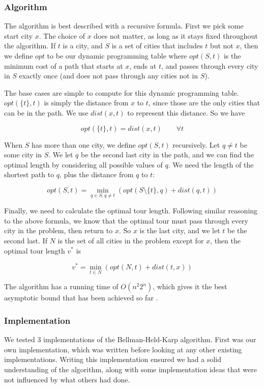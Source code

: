 \documentclass[11pt]{article}
\begin{document}
\subsubsection{Algorithm}

The algorithm is best described with a recursive formula. First we pick some start city $x$. The choice of $x$ does not matter, as long as it stays fixed throughout the algorithm. If $t$ is a city, and $S$ is a set of cities that includes $t$ but not $x$, then we define $opt$ to be our dynamic programming table where $opt(S,t)$ is the minimum cost of a path that starts at $x$, ends at $t$, and passes through every city in $S$ exactly once (and does not pass through any cities not in $S$).

The base cases are simple to compute for this dynamic programming table. $opt(\{ t \} , t)$ is simply the distance from $x$ to $t$, since those are the only cities that can be in the path. We use $dist(x,t)$ to represent this distance. So we have

\[ opt(\{ t \}, t) = dist(x,t) \qquad \forall t \]

When $S$ has more than one city, we define $opt(S,t)$ recursively. Let $q \neq t$ be some city in $S$. We let $q$ be the second last city in the path, and we can find the optimal length by considering all possible values of $q$. We need the length of the shortest path to $q$, plus the distance from $q$ to $t$:

\[ opt(S,t) = \min_{q \in S, q \neq t} ( opt(S \setminus \{ t \} , q) + dist(q, t) ) \]

Finally, we need to calculate the optimal tour length. Following similar reasoning to the above formula, we know that the optimal tour must pass through every city in the problem, then return to $x$. So $x$ is the last city, and we let $t$ be the second last. If $N$ is the set of all cities in the problem except for $x$, then the optimal tour length $v^*$ is

\[ v^* = \min_{t \in N} ( opt(N , t) + dist(t, x) ) \]

The algorithm has a running time of $O(n^2 2^n)$, which gives it the best asymptotic bound that has been achieved so far \cite{bico}.

\subsubsection{Implementation}

We tested 3 implementations of the Bellman-Held-Karp algorithm. First was our own implementation, which was written before looking at any other existing implementations. Writing this implementation ensured we had a solid understanding of the algorithm, along with some implementation ideas that were not influenced by what others had done.
\end{document}
